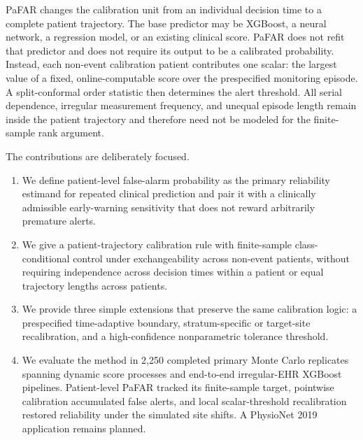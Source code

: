 \documentclass[11pt]{article}
\begin{document}
PaFAR changes the calibration unit from an individual decision time to a complete patient trajectory. The base predictor may be XGBoost, a neural network, a regression model, or an existing clinical score. PaFAR does not refit that predictor and does not require its output to be a calibrated probability. Instead, each non-event calibration patient contributes one scalar: the largest value of a fixed, online-computable score over the prespecified monitoring episode. A split-conformal order statistic then determines the alert threshold. All serial dependence, irregular measurement frequency, and unequal episode length remain inside the patient trajectory and therefore need not be modeled for the finite-sample rank argument.

The contributions are deliberately focused.
\begin{enumerate}
    \item We define patient-level false-alarm probability as the primary reliability estimand for repeated clinical prediction and pair it with a clinically admissible early-warning sensitivity that does not reward arbitrarily premature alerts.
    \item We give a patient-trajectory calibration rule with finite-sample class-conditional control under exchangeability across non-event patients, without requiring independence across decision times within a patient or equal trajectory lengths across patients.
    \item We provide three simple extensions that preserve the same calibration logic: a prespecified time-adaptive boundary, stratum-specific or target-site recalibration, and a high-confidence nonparametric tolerance threshold.
    \item We evaluate the method in 2,250 completed primary Monte Carlo replicates spanning dynamic score processes and end-to-end irregular-EHR XGBoost pipelines. Patient-level PaFAR tracked its finite-sample target, pointwise calibration accumulated false alerts, and local scalar-threshold recalibration restored reliability under the simulated site shifts. A PhysioNet 2019 application remains planned.
\end{enumerate}
\end{document}
